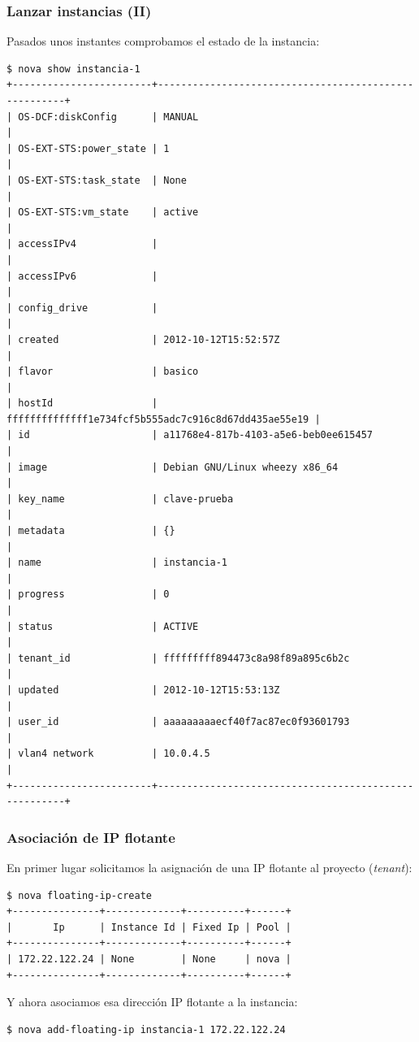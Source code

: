 \documentclass{beamer}
\begin{document}
\begin{frame}[fragile]
  \frametitle{Lanzar instancias (II)}
  Pasados unos instantes comprobamos el estado de la instancia:
\begin{lstlisting}[style=consola]
$ nova show instancia-1
+------------------------+------------------------------------------------------+
| OS-DCF:diskConfig      | MANUAL                                               |
| OS-EXT-STS:power_state | 1                                                    |
| OS-EXT-STS:task_state  | None                                                 |
| OS-EXT-STS:vm_state    | active                                               |
| accessIPv4             |                                                      |
| accessIPv6             |                                                      |
| config_drive           |                                                      |
| created                | 2012-10-12T15:52:57Z                                 |
| flavor                 | basico                                               |
| hostId                 | ffffffffffffff1e734fcf5b555adc7c916c8d67dd435ae55e19 |
| id                     | a11768e4-817b-4103-a5e6-beb0ee615457                 |
| image                  | Debian GNU/Linux wheezy x86_64                       |
| key_name               | clave-prueba                                         |
| metadata               | {}                                                   |
| name                   | instancia-1                                          |
| progress               | 0                                                    |
| status                 | ACTIVE                                               |
| tenant_id              | fffffffff894473c8a98f89a895c6b2c                     |
| updated                | 2012-10-12T15:53:13Z                                 |
| user_id                | aaaaaaaaaecf40f7ac87ec0f93601793                     |
| vlan4 network          | 10.0.4.5                                             |
+------------------------+------------------------------------------------------+
\end{lstlisting}
\end{frame}
\begin{frame}[fragile]
  \frametitle{Asociación de IP flotante}
  En primer lugar solicitamos la asignación de una IP flotante al proyecto
  (\textit{tenant}):
\begin{lstlisting}[style=consola]
$ nova floating-ip-create
+---------------+-------------+----------+------+
|       Ip      | Instance Id | Fixed Ip | Pool |
+---------------+-------------+----------+------+
| 172.22.122.24 | None        | None     | nova |
+---------------+-------------+----------+------+
\end{lstlisting}
Y ahora asociamos esa dirección IP flotante a la instancia:
\begin{lstlisting}[style=consola]
$ nova add-floating-ip instancia-1 172.22.122.24
\end{lstlisting}
\end{frame}
\end{document}
